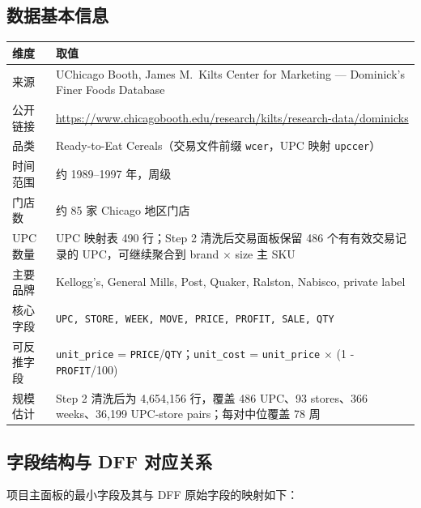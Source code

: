 \documentclass[UTF8,11pt,a4paper,fontset=none]{ctexart}
\begin{document}
\subsection{数据基本信息}

\begin{tabularx}{\textwidth}{L{4.0cm}Y}
\toprule
维度 & 取值 \\
\midrule
来源 & UChicago Booth, James M.\ Kilts Center for Marketing --- Dominick's Finer Foods Database \\
公开链接 & \url{https://www.chicagobooth.edu/research/kilts/research-data/dominicks} \\
品类 & Ready-to-Eat Cereals（交易文件前缀 \texttt{wcer}，UPC 映射 \texttt{upccer}）\\
时间范围 & 约 1989--1997 年，周级 \\
门店数 & 约 85 家 Chicago 地区门店 \\
UPC 数量 & UPC 映射表 490 行；Step 2 清洗后交易面板保留 486 个有有效交易记录的 UPC，可继续聚合到 brand $\times$ size 主 SKU \\
主要品牌 & Kellogg's, General Mills, Post, Quaker, Ralston, Nabisco, private label \\
核心字段 & \texttt{UPC, STORE, WEEK, MOVE, PRICE, PROFIT, SALE, QTY} \\
可反推字段 & \texttt{unit\_price} = \texttt{PRICE}/\texttt{QTY}；\texttt{unit\_cost} = \texttt{unit\_price} $\times$ (1 - \texttt{PROFIT}/100) \\
规模估计 & Step 2 清洗后为 4,654,156 行，覆盖 486 UPC、93 stores、366 weeks、36,199 UPC-store pairs；每对中位覆盖 78 周 \\
\bottomrule
\end{tabularx}

\subsection{字段结构与 DFF 对应关系}

项目主面板的最小字段及其与 DFF 原始字段的映射如下：
\end{document}
